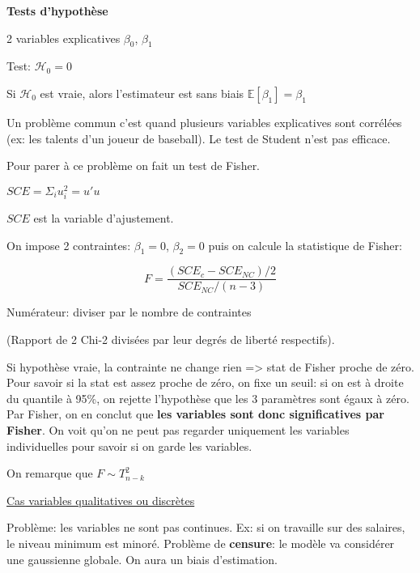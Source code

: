 \documentclass[11pt,a4paper,fleqn]{article}
\begin{document}

{\fontsize{12pt}{22pt} \textbf{Tests d'hypothèse}\par}
\vspace{5mm}
2 variables explicatives $\beta_0$, $\beta_1$

Test: $\mathcal{H}_0=0$

Si $\mathcal{H}_0$ est vraie, alors l'estimateur est sans biais $\mathbb{E}[\beta_1]=\beta_1$

Un problème commun c'est quand plusieurs variables explicatives sont corrélées (ex: les talents d'un joueur de baseball). Le test de Student n'est pas efficace.

Pour parer à ce problème on fait un test de Fisher. 

$SCE = \Sigma_iu_i^2=u'u$

$SCE$ est la variable d'ajustement.

On impose 2 contraintes: $\beta_1=0$, $\beta_2=0$ puis on calcule la statistique de Fisher:

$$F=\frac{(SCE_c-SCE_{NC})/2}{SCE_{NC}/(n-3)}$$

Numérateur: diviser par le nombre de contraintes

(Rapport de 2 Chi-2 divisées par leur degrés de liberté respectifs).

\vspace{5mm}

Si hypothèse vraie, la contrainte ne change rien => stat de Fisher proche de zéro. Pour savoir si la stat est assez proche de zéro, on fixe un seuil: si on est à droite du quantile à 95\%, on rejette l'hypothèse que les 3 paramètres sont égaux à zéro. Par Fisher, on en conclut que \textbf{les variables sont donc significatives par Fisher}. On voit qu'on ne peut pas regarder uniquement les variables individuelles pour savoir si on garde les variables.

\vspace{5mm}

On remarque que $F \sim T^2_{n-k}$

\vspace{5mm}

\underline{Cas variables qualitatives ou discrètes}

Problème: les variables ne sont pas continues. Ex: si on travaille sur des salaires, le niveau minimum est minoré. Problème de \textbf{censure}: le modèle va considérer une gaussienne globale. On aura un biais d'estimation.
\end{document}
